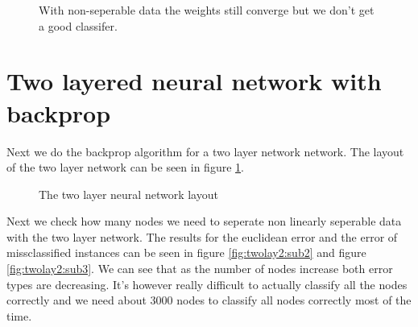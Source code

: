 \documentclass[a4paper,11pt]{article}
\begin{document}
\begin{figure}[h!]
\caption{With non-seperable data the weights still converge but we don't get a good classifer.}
\end{figure}

\clearpage
\section{Two layered neural network with backprop}

Next we do the backprop algorithm for a two layer network network. The layout of the two layer network can be seen in figure \ref{fig:twolay1}.

\vspace{5cm}
\begin{figure}[h!]
\label{fig:twolay1}
\caption{The two layer neural network layout}
\end{figure}

Next we check how many nodes we need to seperate non linearly seperable data with the two layer network. The results for the euclidean error and the error of missclassified instances can be seen in figure \ref{fig:twolay2:sub2} and figure \ref{fig:twolay2:sub3}. We can see that as the number of nodes increase both error types are decreasing. It's however really difficult to actually classify all the nodes correctly and we need about 3000 nodes to classify all nodes correctly most of the time.
\end{document}
